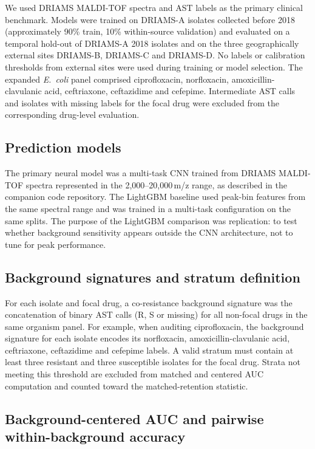 \documentclass[11pt]{article}
\begin{document}
We used DRIAMS MALDI-TOF spectra and AST labels as the primary clinical benchmark\cite{weis2022driams,driamsdryad}. Models were trained on DRIAMS-A isolates collected before 2018 (approximately 90\% train, 10\% within-source validation) and evaluated on a temporal hold-out of DRIAMS-A 2018 isolates and on the three geographically external sites DRIAMS-B, DRIAMS-C and DRIAMS-D. No labels or calibration thresholds from external sites were used during training or model selection. The expanded \textit{E.~coli} panel comprised ciprofloxacin, norfloxacin, amoxicillin-clavulanic acid, ceftriaxone, ceftazidime and cefepime. Intermediate AST calls and isolates with missing labels for the focal drug were excluded from the corresponding drug-level evaluation.

\subsection*{Prediction models}

The primary neural model was a multi-task CNN trained from DRIAMS MALDI-TOF spectra represented in the 2,000--20,000\,m/z range, as described in the companion code repository. The LightGBM baseline used peak-bin features from the same spectral range and was trained in a multi-task configuration on the same splits. The purpose of the LightGBM comparison was replication: to test whether background sensitivity appears outside the CNN architecture, not to tune for peak performance.

\subsection*{Background signatures and stratum definition}

For each isolate and focal drug, a co-resistance background signature was the concatenation of binary AST calls (R, S or missing) for all non-focal drugs in the same organism panel. For example, when auditing ciprofloxacin, the background signature for each isolate encodes its norfloxacin, amoxicillin-clavulanic acid, ceftriaxone, ceftazidime and cefepime labels. A valid stratum must contain at least three resistant and three susceptible isolates for the focal drug. Strata not meeting this threshold are excluded from matched and centered AUC computation and counted toward the matched-retention statistic.

\subsection*{Background-centered AUC and pairwise within-background accuracy}
\end{document}
